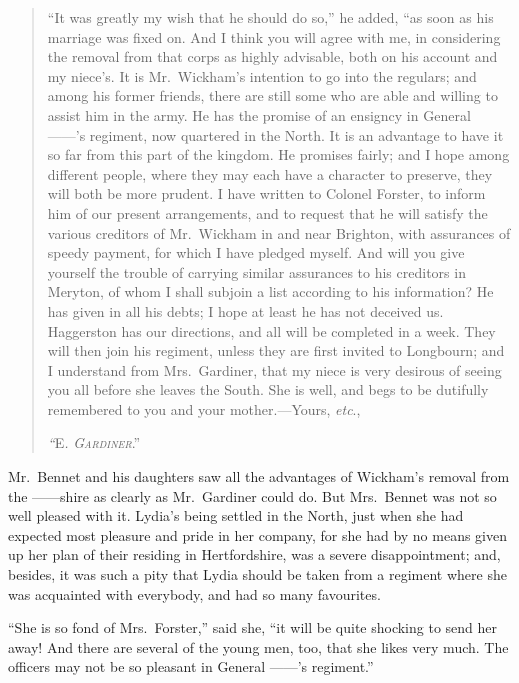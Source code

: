 \documentclass[12pt,english,oneside]{book}
\newcommand{\noun}[1]{\textsc{#1}}
\begin{document}
\begin{quotation}
{}``It was greatly my wish that he should do so,'' he added, {}``as
soon as his marriage was fixed on. And I think you will agree with
me, in considering the removal from that corps as highly advisable,
both on his account and my niece's. It is Mr.\ Wickham's intention
to go into the regulars; and among his former friends, there are still
some who are able and willing to assist him in the army. He has the
promise of an ensigncy in General \mbox{------}'s regiment, now quartered
in the North. It is an advantage to have it so far from this part
of the kingdom. He promises fairly; and I hope among different people,
where they may each have a character to preserve, they will both be
more prudent. I have written to Colonel Forster, to inform him of
our present arrangements, and to request that he will satisfy the
various creditors of Mr.\ Wickham in and near Brighton, with assurances
of speedy payment, for which I have pledged myself. And will you give
yourself the trouble of carrying similar assurances to his creditors
in Meryton, of whom I shall subjoin a list according to his information?
He has given in all his debts; I hope at least he has not deceived
us. Haggerston has our directions, and all will be completed in a
week. They will then join his regiment, unless they are first invited
to Longbourn; and I understand from Mrs.\ Gardiner, that my niece
is very desirous of seeing you all before she leaves the South. She
is well, and begs to be dutifully remembered to you and your mother.\mbox{---}Yours,
\textit{etc}.,

\emph{{}``}\noun{E}\emph{\noun{.}} \textit{\emph{\noun{Gardiner}}}.'' 
\end{quotation}
Mr.\ Bennet and his daughters saw all the advantages of Wickham's
removal from the \mbox{------shire} as clearly as Mr.\ Gardiner
could do. But Mrs.\ Bennet was not so well pleased with it. Lydia's
being settled in the North, just when she had expected most pleasure
and pride in her company, for she had by no means given up her plan
of their residing in Hertfordshire, was a severe disappointment; and,
besides, it was such a pity that Lydia should be taken from a regiment
where she was acquainted with everybody, and had so many favourites.

{}``She is so fond of Mrs.\ Forster,'' said she, {}``it will be
quite shocking to send her away! And there are several of the young
men, too, that she likes very much. The officers may not be so pleasant
in General \mbox{------}'s regiment.''
\end{document}
